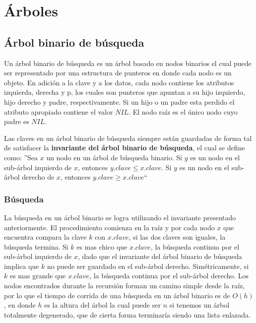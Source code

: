 \newpage
\section{\'Arboles}
\subsection{\'Arbol binario de b\'usqueda}

Un \'arbol binario de b\'usqueda es un \'arbol basado en nodos binarios el cual puede ser representado por una estructura de punteros en donde cada nodo es un objeto. En adici\'on a la clave y a los datos, cada nodo contiene los atributos izquierda, derecha y p, los cuales son punteros que apuntan a su hijo izquierdo, hijo derecho y padre, respectivamente. Si un hijo o un padre esta perdido el atributo apropiado contiene el valor $NIL$. El nodo ra\'iz es el \'unico nodo cuyo padre es $NIL$.

Las claves en un \'arbol binario de b\'usqueda siempre est\'an guardadas de forma tal de satisfacer la \textbf{invariante del \'arbol binario de b\'usqueda}, el cual se define como: ''Sea $x$ un nodo en un \'arbol de b\'usqueda binario. Si $y$ es un nodo en el sub-\'arbol izquierdo de $x$, entonces $y.clave \leq x.clave$. Si $y$ es un nodo en el sub-\'arbol derecho de $x$, entonces $y.clave \geq x.clave$``

\subsubsection{B\'usqueda}

La b\'usqueda en un \'arbol binario se logra utilizando el invariante presentado anteriormente. El procedimiento comienza en la ra\'iz y por cada nodo $x$ que encuentra compara la clave $k$ con $x.clave$, si las dos claves son iguales, la b\'usqueda termina. Si $k$ es mas chico que $x.clave$, la b\'usqueda continua por el sub-\'arbol izquierdo de $x$, dado que el invariante del \'arbol binario de b\'usqueda implica que $k$ no puede ser guardado en el sub-\'arbol derecho. Sim\'etricamente, si $k$ es mas grande que $x.clave$, la b\'usqueda continua por el sub-\'arbol derecho. Los nodos encontrados durante la recursi\'on forman un camino simple desde la ra\'iz, por lo que el tiempo de corrida de una b\'usqueda en un \'arbol binario es de $O(h)$, en donde $h$ es la altura del \'arbol la cual puede ser $n$ si tenemos un \'arbol totalmente degenerado, que de cierta forma terminar\'ia siendo una lista enlazada.

